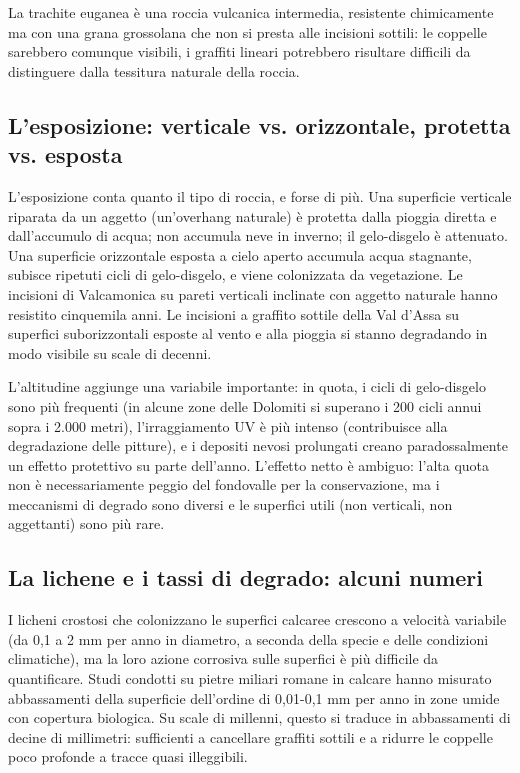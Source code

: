 La trachite euganea è una roccia vulcanica intermedia, resistente chimicamente ma con una grana grossolana che non si presta alle incisioni sottili: le coppelle sarebbero comunque visibili, i graffiti lineari potrebbero risultare difficili da distinguere dalla tessitura naturale della roccia.

\subsection{L'esposizione: verticale vs. orizzontale, protetta vs. esposta}

L'esposizione conta quanto il tipo di roccia, e forse di più. Una superficie verticale riparata da un aggetto (un'overhang naturale) è protetta dalla pioggia diretta e dall'accumulo di acqua; non accumula neve in inverno; il gelo-disgelo è attenuato. Una superficie orizzontale esposta a cielo aperto accumula acqua stagnante, subisce ripetuti cicli di gelo-disgelo, e viene colonizzata da vegetazione. Le incisioni di Valcamonica su pareti verticali inclinate con aggetto naturale hanno resistito cinquemila anni. Le incisioni a graffito sottile della Val d'Assa su superfici suborizzontali esposte al vento e alla pioggia si stanno degradando in modo visibile su scale di decenni.

L'altitudine aggiunge una variabile importante: in quota, i cicli di gelo-disgelo sono più frequenti (in alcune zone delle Dolomiti si superano i 200 cicli annui sopra i 2.000 metri), l'irraggiamento UV è più intenso (contribuisce alla degradazione delle pitture), e i depositi nevosi prolungati creano paradossalmente un effetto protettivo su parte dell'anno. L'effetto netto è ambiguo: l'alta quota non è necessariamente peggio del fondovalle per la conservazione, ma i meccanismi di degrado sono diversi e le superfici utili (non verticali, non aggettanti) sono più rare.

\subsection{La lichene e i tassi di degrado: alcuni numeri}

I licheni crostosi che colonizzano le superfici calcaree crescono a velocità variabile (da 0,1 a 2 mm per anno in diametro, a seconda della specie e delle condizioni climatiche), ma la loro azione corrosiva sulle superfici è più difficile da quantificare. Studi condotti su pietre miliari romane in calcare hanno misurato abbassamenti della superficie dell'ordine di 0,01-0,1 mm per anno in zone umide con copertura biologica. Su scale di millenni, questo si traduce in abbassamenti di decine di millimetri: sufficienti a cancellare graffiti sottili e a ridurre le coppelle poco profonde a tracce quasi illeggibili.

